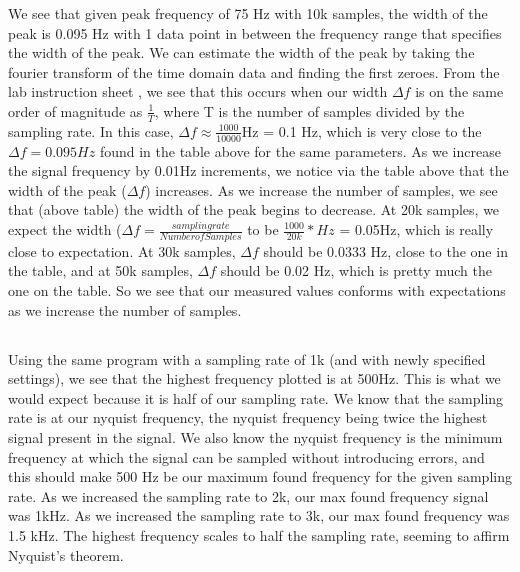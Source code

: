 \documentclass{article}
\begin{document}
    We see that given peak frequency of 75 Hz with 10k samples, the width of the peak is 0.095 Hz with 1 data point in between the frequency range that specifies the width of the peak. We can estimate the width of the peak by taking the fourier transform of the time domain data and finding the first zeroes. From the lab instruction sheet \cite{lab11}, we see that this occurs when our width $\Delta f$ is on the same order of magnitude as $\frac{1}{T}$, where T is the number of samples divided by the sampling rate. In this case, $\Delta f \approx \frac{1000}{10000}$Hz = 0.1 Hz, which is very close to the $\Delta f = 0.095Hz$ found in the table above for the same parameters. As we increase the signal frequency by 0.01Hz increments, we notice via the table above that the width of the peak ($\Delta f$) increases. As we increase the number of samples, we see that (above table) the width of the peak begins to decrease. At 20k samples, we expect the width ($\Delta f = \frac{sampling rate}{Number of Samples}$ to be $\frac{1000}{20k}*Hz$ = 0.05Hz, which is really close to expectation. At 30k samples, $\Delta f$ should be 0.0333 Hz, close to the one in the table, and at 50k samples, $\Delta f$ should be 0.02 Hz, which is pretty much the one on the table. So we see that our measured values conforms with expectations as we increase the number of samples.
    
\subsection{}
    Using the same program with a sampling rate of 1k (and with newly specified settings), we see that the highest frequency plotted is at 500Hz. This is what we would expect because it is half of our sampling rate. We know that the sampling rate is at our nyquist frequency, the nyquist frequency being twice the highest signal present in the signal. We also know the nyquist frequency is the minimum frequency at which the signal can be sampled without introducing errors, and this should make 500 Hz be our maximum found frequency for the given sampling rate. As we increased the sampling rate to 2k, our max found frequency signal was 1kHz. As we increased the sampling rate to 3k, our max found frequency was 1.5 kHz. The highest frequency scales to half the sampling rate, seeming to affirm Nyquist's theorem.
    
\end{document}
